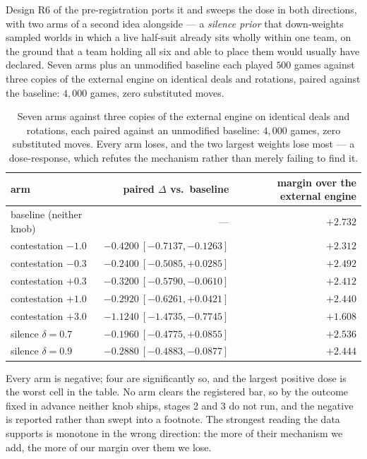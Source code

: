 \documentclass[11pt,letterpaper]{article}
\begin{document}
Design R6 of the pre-registration ports it and sweeps the dose in both
directions, with two arms of a second idea alongside --- a
\emph{silence prior} that down-weights sampled worlds in which a live
half-suit already sits wholly within one team, on the ground that a team
holding all six and able to place them would usually have declared. Seven
arms plus an unmodified baseline each played $500$ games against three
copies of the external engine on identical deals and rotations, paired against the
baseline: $4{,}000$ games, zero substituted moves.

\begin{table}[t]
\centering
\begin{tabular}{lrr}
\toprule
arm & paired $\Delta$ vs.\ baseline & margin over the external engine \\
\midrule
baseline (neither knob)          & ---                       & $+2.732$ \\
contestation $-1.0$              & $-0.4200\ [-0.7137, -0.1263]$ & $+2.312$ \\
contestation $-0.3$              & $-0.2400\ [-0.5085, +0.0285]$ & $+2.492$ \\
contestation $+0.3$              & $-0.3200\ [-0.5790, -0.0610]$ & $+2.412$ \\
contestation $+1.0$              & $-0.2920\ [-0.6261, +0.0421]$ & $+2.440$ \\
contestation $+3.0$              & $-1.1240\ [-1.4735, -0.7745]$ & $+1.608$ \\
silence $\delta = 0.7$           & $-0.1960\ [-0.4775, +0.0855]$ & $+2.536$ \\
silence $\delta = 0.9$           & $-0.2880\ [-0.4883, -0.0877]$ & $+2.444$ \\
\bottomrule
\end{tabular}
\caption{Seven arms against three copies of the external engine on identical deals and rotations, each paired against an unmodified baseline: $4{,}000$ games, zero substituted moves. Every arm loses, and the two largest weights lose most --- a dose-response, which refutes the mechanism rather than merely failing to find it.}
\label{tab:contestation}
\end{table}

Every arm is negative; four are significantly so, and the largest positive
dose is the worst cell in the table. No arm clears the registered bar, so
by the outcome fixed in advance neither knob ships, stages 2 and 3 do not
run, and the negative is reported rather than swept into a footnote. The
strongest reading the data supports is monotone in the wrong direction:
the more of their mechanism we add, the more of our margin over them we
lose.
\end{document}
